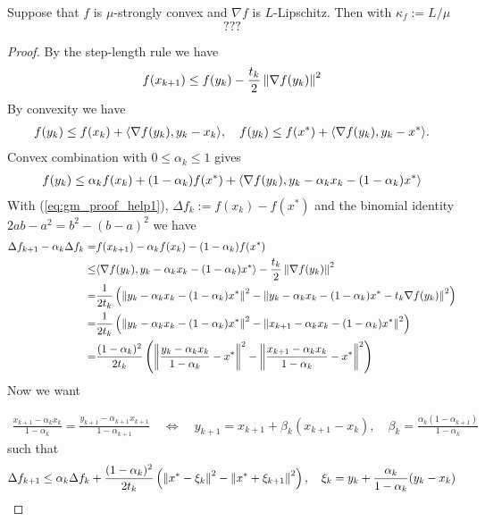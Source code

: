 \documentclass[english,12pt,a4paper]{article}
\begin{document}
%




\begin{proposition}\label{prop:}
Suppose that $f$ is $\mu$-strongly convex and $\nabla f$ is $L$-Lipschitz. Then with $\kappa_f:=L/\mu$
%
\begin{equation}\label{eq:}
???%
\end{equation}
%
\end{proposition}
%
\begin{proof}
%
By the step-length rule  we have
%
%
\begin{equation}\label{eq:gm_proof_help1}
f(x_{k+1}) \le  f(y_k) - \frac{t_k}{2} \left\|\nabla f(y_k)\right\|^2
\end{equation}
%
%
By convexity we have
%
\begin{align*}
f(y_k) \le  f(x_{k}) + \langle\nabla f(y_k),y_{k}-x_{k}\rangle,\quad 
f(y_k) \le  f(x^*) + \langle\nabla f(y_k),y_{k}-x^*\rangle. 
\end{align*}
%
Convex combination with $0\le \alpha_k\le 1$ gives
%
\begin{align*}
f(y_k) \le \alpha_k f(x_{k}) + (1-\alpha_k)f(x^*) + \langle\nabla f(y_k),y_{k}-\alpha_k x_{k}-(1-\alpha_k)x^*\rangle
\end{align*}
%
With (\ref{eq:gm_proof_help1}), $\Delta f_k := f(x_k)-f(x^*)$ and the binomial identity $2ab-a^2 = b^2 -(b-a)^2$ we have
%
\begin{align*}
\Delta f_{k+1} - \alpha_k\Delta f_k =&  f(x_{k+1})-\alpha_k f(x_k)-(1-\alpha_k) f(x^*)\\ 
\le& \langle\nabla f(y_k),y_{k}-\alpha_k x_{k}-(1-\alpha_k)x^*\rangle - \frac{t_k}{2} \left\|\nabla f(y_k)\right\|^2\\
=& \frac{1}{2t_k} \left( \left\|y_{k}-\alpha_k x_{k}-(1-\alpha_k)x^*\right\|^2 - \left\|y_{k}-\alpha_k x_{k}-(1-\alpha_k)x^*-t_k \nabla f(y_k)\right\|^2\right)\\ 
=& \frac{1}{2t_k} \left( \left\|y_{k}-\alpha_k x_{k}-(1-\alpha_k)x^*\right\|^2 - \left\|x_{k+1}-\alpha_k x_{k}-(1-\alpha_k)x^*\right\|^2\right)\\ 
=& \frac{(1-\alpha_k)^2}{2t_k} \left( \left\|\frac{y_{k}-\alpha_k x_{k}}{1-\alpha_k}-x^*\right\|^2 - \left\|\frac{x_{k+1}-\alpha_k x_{k}}{1-\alpha_k}-x^*\right\|^2\right) 
\end{align*}
%
Now we want

%
\begin{align*}
\frac{x_{k+1}-\alpha_k x_{k}}{1-\alpha_k} = \frac{y_{k+1}-\alpha_{k+1} x_{k+1}}{1-\alpha_{k+1}}
\quad\Leftrightarrow\quad 
y_{k+1} = x_{k+1} + \beta_k \left(x_{k+1}-x_k\right),\quad \beta_k = \frac{\alpha_k(1-\alpha_{k+1})}{1-\alpha_k} 
\end{align*}
%
%
such that
%
\begin{align*}
\Delta f_{k+1} \le \alpha_k\Delta f_k + \frac{(1-\alpha_k)^2}{2t_k} \left( \left\|x^* - \xi_k\right\|^2 - \left\|x^*+ \xi_{k+1}\right\|^2\right) ,\quad
\xi_k = y_k + \frac{\alpha_k}{1-\alpha_k}(y_k-x_k)
\end{align*}
%


\end{proof}
\end{document}
